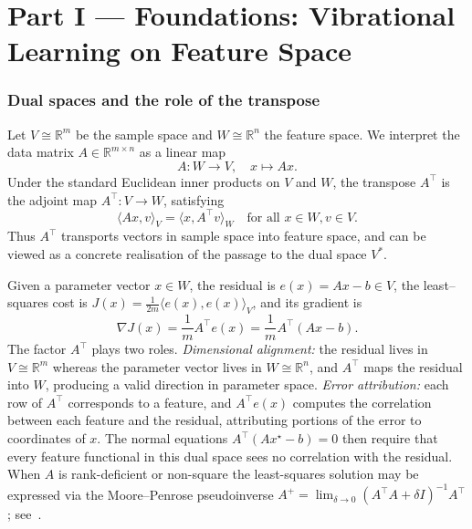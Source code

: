 \documentclass[12pt,a4paper]{article}
\theoremstyle{plain}
\theoremstyle{definition}
\theoremstyle{remark}
\newcommand{\R}{\mathbb{R}}
\newcommand{\1}{\mathbf{1}}
\begin{document}
\part*{Part I --- Foundations: Vibrational Learning on Feature Space}

\section{Dual spaces and the role of the transpose}
\label{sec:dual_spaces}

Let $V \cong \R^m$ be the sample space and $W \cong \R^n$ the feature
space. We interpret the data matrix $A \in \R^{m \times n}$ as a linear
map
\begin{equation}
    A : W \longrightarrow V, \quad x \mapsto A x.
\end{equation}
Under the standard Euclidean inner products on $V$ and $W$, the
transpose $A^\top$ is the adjoint map $A^\top : V \to W$, satisfying
\begin{equation}
    \langle A x, v \rangle_V = \langle x, A^\top v \rangle_W
    \quad \text{for all } x \in W, v \in V.
\end{equation}
Thus $A^\top$ transports vectors in sample space into feature space, and
can be viewed as a concrete realisation of the passage to the dual space
$V^*$.

Given a parameter vector $x \in W$, the residual is
$e(x) = A x - b \in V$, the least--squares cost is
$J(x) = \frac{1}{2m} \langle e(x), e(x) \rangle_V$, and its gradient is
\begin{equation}
    \nabla J(x)
    = \frac{1}{m} A^\top e(x)
    = \frac{1}{m} A^\top (A x - b).
\end{equation}
The factor $A^\top$ plays two roles. \emph{Dimensional alignment:} the
residual lives in $V \cong \R^m$ whereas the parameter vector lives in
$W \cong \R^n$, and $A^\top$ maps the residual into $W$, producing a
valid direction in parameter space. \emph{Error attribution:} each row
of $A^\top$ corresponds to a feature, and $A^\top e(x)$ computes the
correlation between each feature and the residual, attributing portions
of the error to coordinates of $x$. The normal equations
$A^\top (A x^\star - b) = 0$ then require that every feature functional
in this dual space sees no correlation with the residual. When $A$ is
rank-deficient or non-square the least-squares solution may be expressed
via the Moore--Penrose pseudoinverse
$A^+ = \lim_{\delta \to 0}(A^\top A + \delta I)^{-1}A^\top$;
see~\cite{golub_vanloan}.
\end{document}
